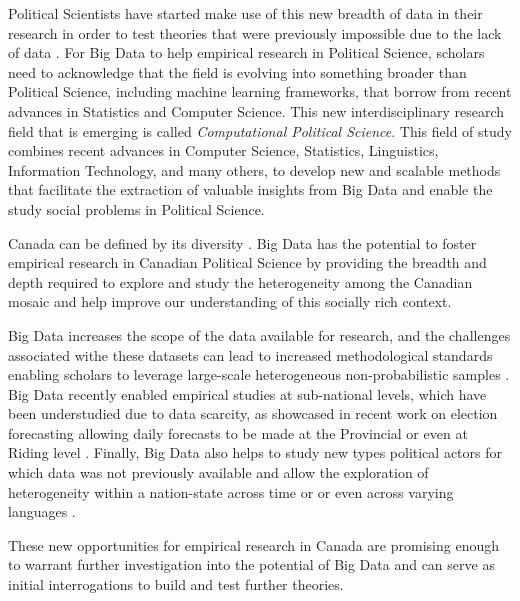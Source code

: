 \documentclass{article}
\begin{document}
Political Scientists have started make use of this new breadth of data in their research in order to test theories that were previously impossible due to the lack of data \citep{rheault2019word, temporao2018ideological}.
For Big Data to help empirical research in Political Science, scholars need to acknowledge that the field is evolving into something broader than Political Science, including machine learning frameworks, that borrow from recent advances in Statistics and Computer Science.
This new interdisciplinary research field that is emerging is called \textit{Computational Political Science}.
This field of study combines recent advances in Computer Science, Statistics, Linguistics, Information Technology, and many others, to develop new and scalable methods that facilitate the extraction of valuable insights from Big Data and enable the study social problems in Political Science.

Canada can be defined by its diversity \citep{dufresne2018symbolic}.
Big Data has the potential to foster empirical research in Canadian Political Science by providing the breadth and depth required to explore and study the heterogeneity among the Canadian mosaic and help improve our understanding of this socially rich context.

Big Data increases the scope of the data available for research, and the challenges associated withe these datasets can lead to increased methodological standards enabling scholars to leverage large-scale heterogeneous non-probabilistic samples \citep{ruths2014social, shiffrin2016drawing}.
Big Data recently enabled empirical studies at sub-national levels, which have been understudied due to data scarcity, as showcased in recent work on election forecasting allowing daily forecasts to be made at the Provincial or even at Riding level \citep{temporao2019crowdsourcing}.
Finally, Big Data also helps to study new types political actors for which data was not previously available and allow the exploration of heterogeneity within a nation-state across time or or even across varying languages \citep{temporao2018ideological, rheault2019word}.

These new opportunities for empirical research in Canada are promising enough to warrant further investigation into the potential of Big Data and can serve as initial interrogations to build and test further theories.

\newpage


\end{document}
